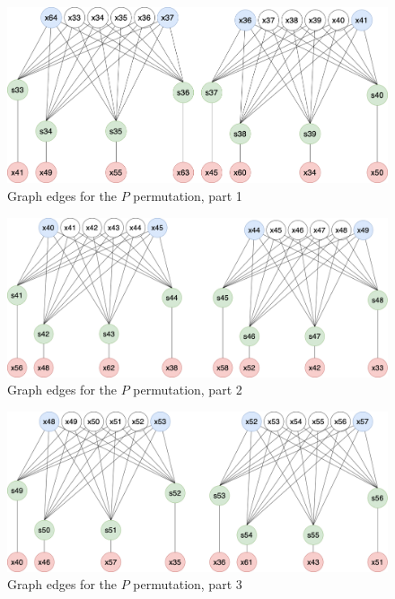 \documentclass{report}
\begin{document}
\begin{figure}[h!]
    \centering
    \includegraphics[scale=0.3]{Grafo_DES-p1.png}
    \caption{Graph edges for the $P$ permutation, part 1}
    \label{fig:perm1}
\end{figure}

\begin{figure}[h!]
    \centering
    \includegraphics[scale=0.3]{Grafo_DES-p2.png}
    \caption{Graph edges for the $P$ permutation, part 2}
    \label{fig:perm2}
\end{figure}

\begin{figure}[h!]
    \centering
    \includegraphics[scale=0.3]{Grafo_DES-p3.png}
    \caption{Graph edges for the $P$ permutation, part 3}
    \label{fig:perm3}
\end{figure}
\end{document}
